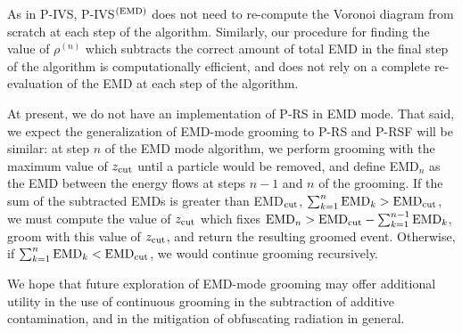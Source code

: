 \documentclass[letterpaper,11pt]{article}
\begin{document}
As in P-IVS, P-IVS\(^{(\rm EMD)}\) does not need to re-compute the Voronoi diagram from scratch at each step of the algorithm.
%
Similarly, our procedure for finding the value of \(\rho^{(n)}\) which subtracts the correct amount of total EMD in the final step of the algorithm is computationally efficient, and does not rely on a complete re-evaluation of the EMD at each step of the algorithm.


At present, we do not have an implementation of P-RS in EMD mode.
%
That said, we expect the generalization of EMD-mode grooming to P-RS and P-RSF will be similar:
%
at step \(n\) of the EMD mode algorithm, we perform grooming with the maximum value of \(z_{\rm cut}\) until a particle would be removed, and define EMD\(_n\) as the EMD between the energy flows at steps \(n-1\) and \(n\) of the grooming.
%
If the sum of the subtracted EMDs is greater than EMD\(_{\rm cut}\), \(\sum_{k = 1}^n {\rm EMD}_k > {\rm EMD}_{\rm cut}\),
%
we must compute the value of \(z_{\rm cut}\) which fixes \({\rm EMD}_n > {\rm EMD}_{\rm cut} - \sum_{k = 1}^{n-1} {\rm EMD}_k \), groom with this value of \(z_{\rm cut}\), and return the resulting groomed event.
%
Otherwise, if \(\sum_{k = 1}^n {\rm EMD}_k < {\rm EMD}_{\rm cut}\), we would continue grooming recursively.

We hope that future exploration of EMD-mode grooming may offer additional utility in the use of continuous grooming in the subtraction of additive contamination, and in the mitigation of obfuscating radiation in general.


\end{document}
